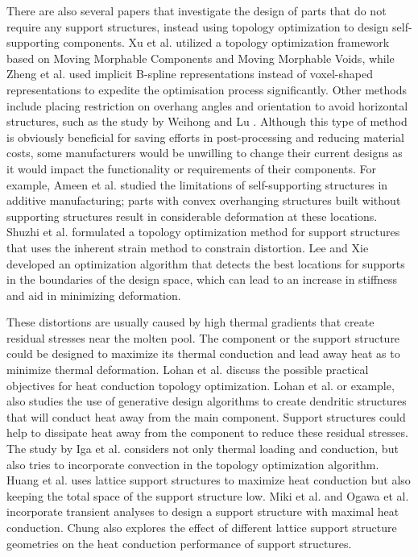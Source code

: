 \documentclass[../main.tex]{subfiles}
\begin{document}
There are also several papers that investigate the design of parts that do not require any support structures, instead using topology optimization to design self-supporting components. Xu et al. \cite{guoSelfsupportingStructureDesign2017} utilized a topology optimization framework based on Moving Morphable Components and Moving Morphable Voids, while Zheng et al. \cite{zhengTopologyOptimizationSelfsupporting2024} used implicit B-spline representations instead of voxel-shaped representations to expedite the optimisation process significantly. Other methods include placing restriction on overhang angles and orientation to avoid horizontal structures, such as the study by Weihong and Lu \cite{zhangTopologyOptimizationSelfsupporting2018}. Although this type of method is obviously beneficial for saving efforts in post-processing and reducing material costs, some manufacturers would be unwilling to change their current designs as it would impact the functionality or requirements of their components. For example, Ameen et al. \cite{ameenSelfsupportingOverhangStructures2019} studied the limitations of self-supporting structures in additive manufacturing; parts with convex overhanging structures built without supporting structures result in considerable deformation at these locations. Shuzhi et al. \cite{xuSupportStructureTopology2024} formulated a topology optimization method for support structures that uses the inherent strain method to constrain distortion. Lee and Xie \cite{leeSimultaneouslyOptimizingSupports2021} developed an optimization algorithm that detects the best locations for supports in the boundaries of the design space, which can lead to an increase in stiffness and aid in minimizing deformation. 

These distortions are usually caused by high thermal gradients that create residual stresses near the molten pool. The component or the support structure could be designed to maximize its thermal conduction and lead away heat as to minimize thermal deformation. Lohan et al. \cite{lohanStudyPracticalObjectives2020} discuss the possible practical objectives for heat conduction topology optimization. Lohan et al.
or example, \cite{lohanTopologyOptimizationHeat2017} also studies the use of generative design algorithms to create dendritic structures that will conduct heat away from the main component. Support structures could help to dissipate heat away from the component to reduce these residual stresses. The study by Iga et al. \cite{igaTopologyOptimizationThermal2009} considers not only thermal loading and conduction, but also tries to incorporate convection in the topology optimization algorithm. Huang et al. \cite{huangTopologyOptimizationLattice2020} uses lattice support structures to maximize heat conduction but also keeping the total space of the support structure low. Miki et al. \cite{mikiTopologyOptimizationConsidering2021} and Ogawa et al. \cite{ogawaTopologyOptimizationTransient2022} incorporate transient analyses to design a support structure with maximal heat conduction. Chung \cite{chungpei-hsuStudyLatticeSupport2024} also explores the effect of different lattice support structure geometries on the heat conduction performance of support structures.
\end{document}
